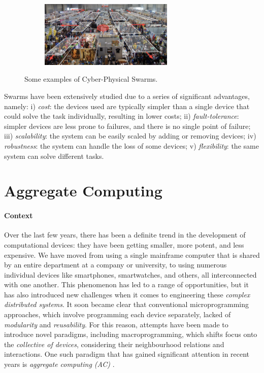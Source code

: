 \documentclass[12pt,a4paper,openright,twoside]{book}
\begin{document}
\begin{figure}[t]
\begin{subfigure}[b]{0.49\textwidth}
        \centering
        \includegraphics[width=0.7\textwidth]{figures/crowd.png}
    \end{subfigure}
    \caption{Some examples of Cyber-Physical Swarms.}%
    \label{fig:cpsw}
\end{figure}


Swarms have been extensively studied due to a series of significant advantages, namely:
    i) \emph{cost}: the devices used are typically simpler than a single device that could solve the task individually, resulting in lower costs;
    ii) \emph{fault-tolerance}: simpler devices are less prone to failures, and there is no single point of failure;
    iii) \emph{scalability}: the system can be easily scaled by adding or removing devices;
    iv) \emph{robustness}: the system can handle the loss of some devices;
    v) \emph{flexibility}: the same system can solve different tasks.


%
\section{Aggregate Computing}

\paragraph{Context}
Over the last few years, there has been a definite trend in the development of computational devices: 
    they have been getting smaller, more potent, and less expensive. We have moved from using a 
    single mainframe computer that is shared by an entire department at a company or university, 
    to using numerous individual devices like smartphones, smartwatches, and others, all interconnected
    with one another. This phenomenon has led to a range of opportunities, but it has also introduced 
    new challenges when it comes to engineering these \emph{complex distributed systems}. It soon became clear 
    that conventional microprogramming approaches, which involve programming each device separately, lacked of 
    \emph{modularity} and \emph{reusability}. For this reason, attempts have been made to introduce novel paradigms, including 
    macroprogramming, which shifts focus onto the \emph{collective of devices}, considering their neighbourhood 
    relations and interactions.
    One such paradigm that has gained significant attention in recent years is \emph{aggregate computing (AC)} \cite{AC}.
\end{document}
